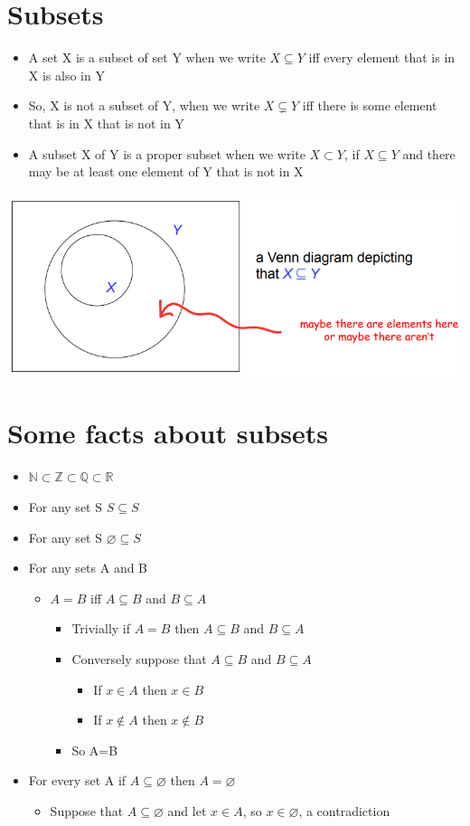 \documentclass{article}[18pt]
\begin{document}
\section{Subsets}
\begin{itemize}
	\item A set X is a subset of set Y when we write $X\subseteq Y$ iff every element that is in X is also in Y
	\item So, X is not a subset of Y, when we write $X\subsetneq Y$ iff there is some element that is in X that is not in Y
	\item A subset X of Y is a proper subset when we write $X\subset Y$, if $X\subseteq Y$ and there may be at least one element of Y that is not in X
\end{itemize}
\begin{center}
	\includegraphics[scale=0.7]{venn1}
\end{center}
\section{Some facts about subsets}
\begin{itemize}
	\item $\mathbb{N}\subset \mathbb{Z}\subset \mathbb{Q}\subset \mathbb{R}$
	\item For any set S $S\subseteq S$
	\item For any set S $\varnothing\subseteq S$
	\item For any sets A and B
	\begin{itemize}
		\item $A=B$ iff $A\subseteq B$ and $B\subseteq A$
		\begin{itemize}
			\item Trivially if $A=B$ then $A\subseteq B$ and $B\subseteq A$
			\item Conversely suppose that $A\subseteq B$ and $B\subseteq A$
			\begin{itemize}
				\item If $x\in A$ then $x\in B$
				\item If $x\notin A$ then $x\notin B$
			\end{itemize}
			\item So A=B
		\end{itemize}
	\end{itemize}
	\item For every set A if $A\subseteq \varnothing$ then $A=\varnothing$
	\begin{itemize}
		\item Suppose that $A\subseteq \varnothing$ and let $x\in A$, so $x\in \varnothing$, a contradiction
	\end{itemize}
\end{itemize}
\end{document}
